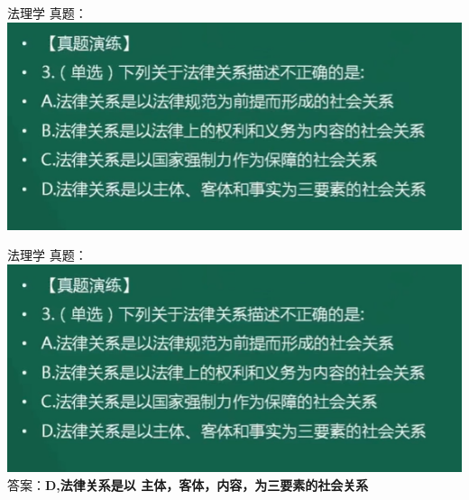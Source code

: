 \documentclass[aspectratio=169]{beamer}
\begin{document}
\begin{frame}[t]{法理学}
    真题：\\
    \includegraphics[scale=0.5]{003}\\ 
\end{frame}


\begin{frame}[t]{法理学}
    真题：\\
    \includegraphics[scale=0.5]{003}\\ 
    答案：\textbf{D,法律关系是以 主体，客体，内容，为三要素的社会关系}\\
\end{frame}
\end{document}
